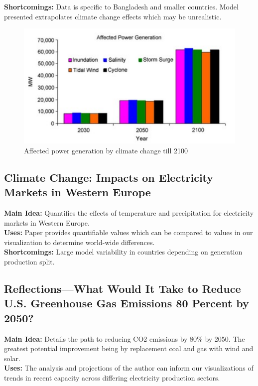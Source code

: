 \documentclass[sigconf,nonacm=true]{acmart}
\begin{document}
\textbf{Shortcomings:} Data is specific to Bangladesh and smaller countries. Model presented extrapolates climate change effects which may be unrealistic.\\
\begin{figure}[H]
	\centering
	\includegraphics[width=0.7\linewidth]{images/bangladeshBar}
	\caption{Affected power generation by climate change till 2100 \protect\cite{Western_Europe_GolombekRolf2012Ccio}}
	\label{fig:westerEuropeBar}
\end{figure}

\subsection{Climate Change: Impacts on Electricity Markets in Western Europe \cite[Page Count:~14]{Western_Europe_GolombekRolf2012Ccio}}
\textbf{Main Idea:} Quantifies the effects of temperature and precipitation for electricity markets in Western Europe. \\

\textbf{Uses:} Paper provides quantifiable values which can be compared to values in our visualization to determine world-wide differences.\\

\textbf{Shortcomings:}  Large model variability in countries depending on generation production split.\\


\subsection{Reflections—What Would It Take to Reduce U.S. Greenhouse Gas Emissions 80 Percent by 2050? \cite[Page Count:~16]{reduce_greenhouse_rex014}}
\textbf{Main Idea:} Details the path to reducing CO2 emissions by 80\% by 2050. The greatest potential improvement being by replacement coal and gas with wind and solar. \\

\textbf{Uses:}  The analysis and projections of the author can inform our visualizations of trends in recent capacity across differing electricity production sectors. \\
\end{document}
